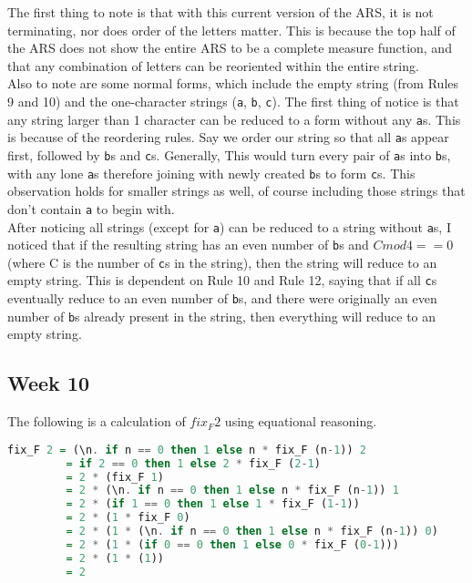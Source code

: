 \documentclass{article}
\theoremstyle{theorem}
\theoremstyle{definition}
\theoremstyle{remark}
\begin{document}
\noindent The first thing to note is that with this current version of the ARS, it is not terminating, nor does order of the letters matter. This is because the top half of the ARS does not show the entire ARS to be a complete measure function, and that any combination of letters can be reoriented within the entire string. \\

\noindent Also to note are some normal forms, which include the empty string (from Rules 9 and 10) and the one-character strings (\texttt{a}, \texttt{b}, \texttt{c}). The first thing of notice is that any string larger than 1 character can be reduced to a form without any \texttt{a}s. This is because of the reordering rules. Say we order our string so that all \texttt{a}s appear first, followed by \texttt{b}s and \texttt{c}s. Generally, This would turn every pair of \texttt{a}s into \texttt{b}s, with any lone \texttt{a}s therefore joining with newly created \texttt{b}s to form \texttt{c}s. This observation holds for smaller strings as well, of course including those strings that don't contain \texttt{a} to begin with.\\

\noindent After noticing all strings (except for \texttt{a}) can be reduced to a string without \texttt{a}s, I noticed that if the resulting string has an even number of \texttt{b}s and $C mod 4 == 0$ (where C is the number of \texttt{c}s in the string), then the string will reduce to an empty string. This is dependent on Rule 10 and Rule 12, saying that if all \texttt{c}s eventually reduce to an even number of \texttt{b}s, and there were originally an even number of \texttt{b}s already present in the string, then everything will reduce to an empty string.
\subsection{Week 10}
The following is a calculation of $fix_F 2$ using equational reasoning.

\begin{lstlisting}[language=Haskell]
fix_F 2 = (\n. if n == 0 then 1 else n * fix_F (n-1)) 2
         = if 2 == 0 then 1 else 2 * fix_F (2-1)
         = 2 * (fix_F 1)
         = 2 * (\n. if n == 0 then 1 else n * fix_F (n-1)) 1
         = 2 * (if 1 == 0 then 1 else 1 * fix_F (1-1))
         = 2 * (1 * fix_F 0)
         = 2 * (1 * (\n. if n == 0 then 1 else n * fix_F (n-1)) 0)
         = 2 * (1 * (if 0 == 0 then 1 else 0 * fix_F (0-1)))
         = 2 * (1 * (1))
         = 2
\end{lstlisting}
\newpage
\end{document}
